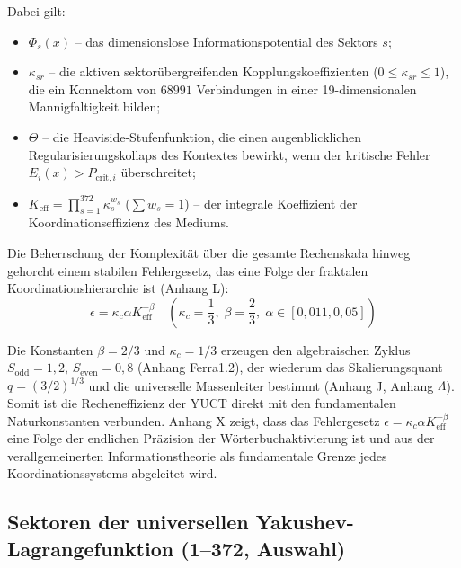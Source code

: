 \documentclass[12pt,a4paper]{article}
\begin{document}
	Dabei gilt:
	\begin{itemize}
		\item \(\Phi_s(x)\) – das dimensionslose Informationspotential des Sektors \(s\);
		\item \(\kappa_{sr}\) – die aktiven sektorübergreifenden Kopplungskoeffizienten (\(0 \le \kappa_{sr} \le 1\)), die ein Konnektom von \(68991\) Verbindungen in einer 19-dimensionalen Mannigfaltigkeit bilden;
		\item \(\Theta\) – die Heaviside-Stufenfunktion, die einen augenblicklichen Regularisierungskollaps des Kontextes bewirkt, wenn der kritische Fehler \(E_i(x) > P_{\text{crit},i}\) überschreitet;
		\item \(K_{\text{eff}} = \prod_{s=1}^{372} \kappa_s^{w_s}\) (\(\sum w_s = 1\)) – der integrale Koeffizient der Koordinationseffizienz des Mediums.
	\end{itemize}
	
	Die Beherrschung der Komplexität über die gesamte Rechenskała hinweg gehorcht einem stabilen Fehlergesetz, das eine Folge der fraktalen Koordinationshierarchie ist (Anhang L):
	\begin{equation}
		\epsilon = \kappa_c \alpha K_{\text{eff}}^{-\beta} \quad \left(\kappa_c = \frac{1}{3}, \; \beta = \frac{2}{3}, \; \alpha \in [0{,}011, 0{,}05]\right)
	\end{equation}
	
	Die Konstanten \(\beta = 2/3\) und \(\kappa_c = 1/3\) erzeugen den algebraischen Zyklus \(S_{\mathrm{odd}} = 1{,}2\), \(S_{\mathrm{even}} = 0{,}8\) (Anhang Ferra1.2), der wiederum das Skalierungsquant \(q = (3/2)^{1/3}\) und die universelle Massenleiter bestimmt (Anhang J, Anhang \(\Lambda\)). Somit ist die Recheneffizienz der YUCT direkt mit den fundamentalen Naturkonstanten verbunden. Anhang X zeigt, dass das Fehlergesetz \(\epsilon = \kappa_c\alpha K_{\mathrm{eff}}^{-\beta}\) eine Folge der endlichen Präzision der Wörterbuchaktivierung ist und aus der verallgemeinerten Informationstheorie als fundamentale Grenze jedes Koordinationssystems abgeleitet wird.
	
	\subsection{Sektoren der universellen Yakushev-Lagrangefunktion (1--372, Auswahl)}
	\label{sec:sectors}
	
\end{document}
